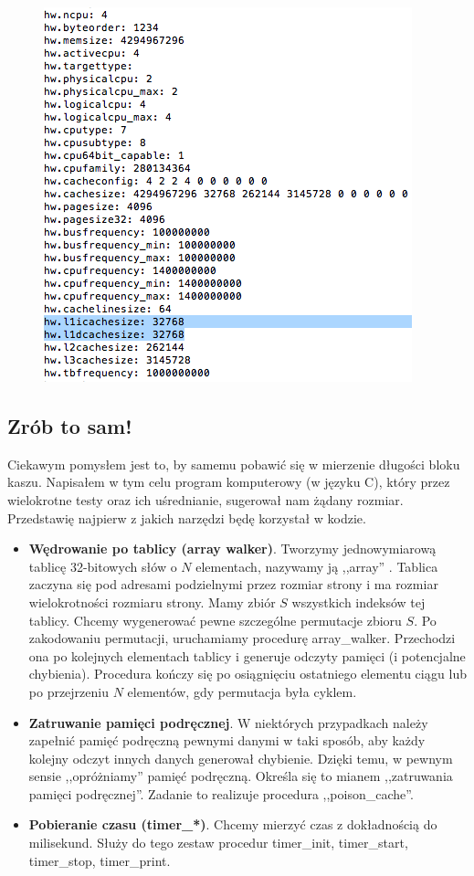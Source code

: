 \documentclass{article}
\begin{document}
\begin{figure}[h!]
\centering
\includegraphics[scale=0.5]{kaszinfo}  
\end{figure}
 
\subsection{Zrób to sam!}
 
Ciekawym pomysłem jest to, by samemu pobawić się w mierzenie długości bloku kaszu. Napisałem w tym celu program komputerowy (w języku C), który przez wielokrotne testy oraz ich uśrednianie,   sugerował nam żądany rozmiar.
Przedstawię najpierw z jakich narzędzi będę korzystał w kodzie.
 
\begin{itemize}
\item \textbf{Wędrowanie po tablicy (array walker)}. Tworzymy jednowymiarową tablicę 32-bitowych słów o $N$ elementach, nazywamy ją ,,array'' . Tablica zaczyna się pod adresami podzielnymi przez rozmiar strony i ma rozmiar wielokrotności rozmiaru strony. Mamy zbiór $S$ wszystkich indeksów tej tablicy. Chcemy wygenerować pewne szczególne permutacje zbioru $S$. Po zakodowaniu permutacji, uruchamiamy procedurę array\_walker. Przechodzi ona po kolejnych elementach tablicy i generuje odczyty pamięci (i potencjalne chybienia). Procedura kończy się po osiągnięciu    ostatniego elementu ciągu lub po przejrzeniu $N$ elementów, gdy permutacja była cyklem.
 
\item \textbf{Zatruwanie pamięci podręcznej}. W niektórych przypadkach należy zapełnić pamięć podręczną pewnymi danymi w taki sposób, aby każdy kolejny odczyt innych danych generował chybienie. Dzięki temu, w pewnym sensie ,,opróżniamy'' pamięć podręczną. Określa się to mianem ,,zatruwania pamięci podręcznej''. Zadanie to realizuje procedura ,,poison\_cache''.
 
\item \textbf{ Pobieranie czasu (timer\_*)}. Chcemy mierzyć czas z dokładnością do milisekund. Służy do tego zestaw procedur timer\_init, timer\_start, timer\_stop, timer\_print.
 
\end{itemize}
 
\end{document}
